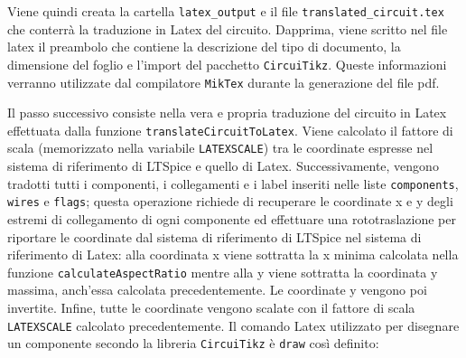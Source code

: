 \noindent
Viene quindi creata la cartella \texttt{latex\_output} e il file \texttt{translated\_circuit.tex} che conterrà la traduzione in Latex del circuito. Dapprima, viene scritto nel file latex il preambolo che contiene la descrizione del tipo di documento, la dimensione del foglio e l'import del pacchetto \texttt{CircuiTikz}. Queste informazioni verranno utilizzate dal compilatore \texttt{MikTex} durante la generazione del file pdf.

\noindent
Il passo successivo consiste nella vera e propria traduzione del circuito in Latex effettuata dalla funzione \texttt{translateCircuitToLatex}. Viene calcolato il fattore di scala (memorizzato nella variabile \texttt{LATEXSCALE}) tra le coordinate espresse nel sistema di riferimento di LTSpice e quello di Latex. Successivamente, vengono tradotti tutti i componenti, i collegamenti e i label inseriti nelle liste \texttt{components}, \texttt{wires} e \texttt{flags}; questa operazione richiede di recuperare le coordinate x e y degli estremi di collegamento di ogni componente ed effettuare una rototraslazione per riportare le coordinate dal sistema di riferimento di LTSpice nel sistema di riferimento di Latex: alla coordinata x viene sottratta la x minima calcolata nella funzione \texttt{calculateAspectRatio} mentre alla y viene sottratta la coordinata y massima, anch'essa calcolata precedentemente. Le coordinate y vengono poi invertite. Infine, tutte le coordinate vengono scalate con il fattore di scala \texttt{LATEXSCALE} calcolato precedentemente. Il comando Latex utilizzato per disegnare un componente secondo la libreria \texttt{CircuiTikz} è \texttt{draw} così definito:
